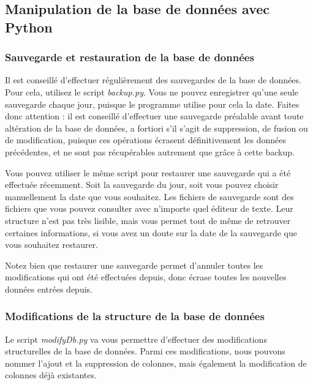 \documentclass[12pt,a4paper]{article}
\begin{document}
    \bigskip
    \subsection{Manipulation de la base de données avec Python}
        \subsubsection{Sauvegarde et restauration de la base de données}\label{sauvegarde}

            Il est conseillé d'effectuer régulièrement des sauvegardes de la base de données.
            Pour cela, utilisez le script \emph{backup.py}. Vous ne pouvez enregistrer qu'une seule sauvegarde
            chaque jour, puisque le programme utilise pour cela la date. Faites donc attention : il est conseillé d'effectuer
            une sauvegarde préalable avant toute altération de la base de données, a fortiori s'il s'agit de suppression,
            de fusion ou de modification, puisque ces opérations écrasent définitivement les données précédentes, et ne sont
            pas récupérables autrement que grâce à cette backup.

            Vous pouvez utiliser le même script pour restaurer une sauvegarde qui a été effectuée récemment. Soit la sauvegarde
            du jour, soit vous pouvez choisir manuellement la date que vous souhaitez.
            Les fichiers de sauvegarde sont des fichiers que vous pouvez consulter avec n'importe quel éditeur de texte.
            Leur structure n'est pas très lisible, mais vous permet tout de même de retrouver certaines informations, si vous
            avez un doute sur la date de la sauvegarde que vous souhaitez restaurer.

            Notez bien que restaurer une sauvegarde permet d'annuler toutes les modifications qui ont été effectuées depuis,
            donc écrase toutes les nouvelles données entrées depuis.


        \bigskip
        \subsubsection{Modifications de la structure de la base de données}\label{modificationstructure}
            Le script \emph{modifyDb.py} va vous permettre d'effectuer des
            modifications structurelles de la base de données.
            Parmi ces modifications, nous pouvons nommer l'ajout et la suppression
            de colonnes, mais également la modification de colonnes déjà existantes.
            
\end{document}
